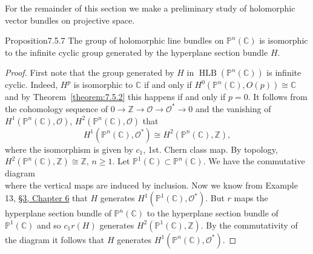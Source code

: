 For the remainder of this section we make a preliminary study of holomorphic vector bundles on projective space.

\begin{originaltheorem}{Proposition}{7.5.7}
The group of holomorphic line bundles on $\mathbb{P}^n(\mathbb{C})$ is isomorphic to the infinite cyclic group generated by the hyperplane section bundle $H$.
\end{originaltheorem}
\begin{proof}
First note that the group generated by $H$ in $\operatorname{HLB}(\mathbb{P}^n(\mathbb{C}))$ is infinite cyclic. Indeed, $H^p$ is isomorphic to $\mathbb{C}$ if and only if $H^0(\mathbb{P}^n(\mathbb{C}),O(p))\cong\mathbb{C}$ and by Theorem~\ref{theorem:7.5.2} this happens if and only if $p=0$. It follows from the cohomology sequence of $0\to\mathbb{Z}\to\mathcal{O}\to\mathcal{O}^*\to0$ and the vanishing of $H^1(\mathbb{P}^n(\mathbb{C}),\mathcal{O})$, $H^2(\mathbb{P}^n(\mathbb{C}),\mathcal{O})$ that
\[
H^1(\mathbb{P}^n(\mathbb{C}),\mathcal{O}^*)\cong H^2(\mathbb{P}^n(\mathbb{C}),\mathbb{Z}),
\]
where the isomorphism is given by $c_1$, 1st. Chern class map. By topology, $H^2(\mathbb{P}^n(\mathbb{C}),\mathbb{Z})\cong\mathbb{Z}$, $n\geq1$. Let $\mathbb{P}^1(\mathbb{C})\subset\mathbb{P}^n(\mathbb{C})$. We have the commutative diagram
\[

\]
where the vertical maps are induced by inclusion. Now we know from Example 13, \hyperref[sec:6:3]{\S3, Chapter 6} that $H$ generates $H^1(\mathbb{P}^1(\mathbb{C}),\mathcal{O}^*)$. But $r$ maps the hyperplane section bundle of $\mathbb{P}^n(\mathbb{C})$ to the hyperplane section bundle of $\mathbb{P}^1(\mathbb{C})$ and so $c_1r(H)$ generates $H^2(\mathbb{P}^1(\mathbb{C}),\mathbb{Z})$. By the commutativity of the diagram it follows that $H$ generates $H^1(\mathbb{P}^n(\mathbb{C}),\mathcal{O}^*)$.
\end{proof}

